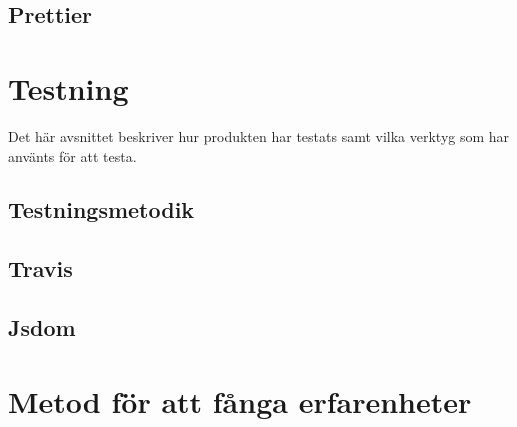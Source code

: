 \subsection*{Prettier}

\section{Testning}
Det här avsnittet beskriver hur produkten har testats samt vilka verktyg som har använts för att testa.
\subsection*{Testningsmetodik}
\subsection*{Travis}
\subsection*{Jsdom}

\section{Metod för att fånga erfarenheter}




